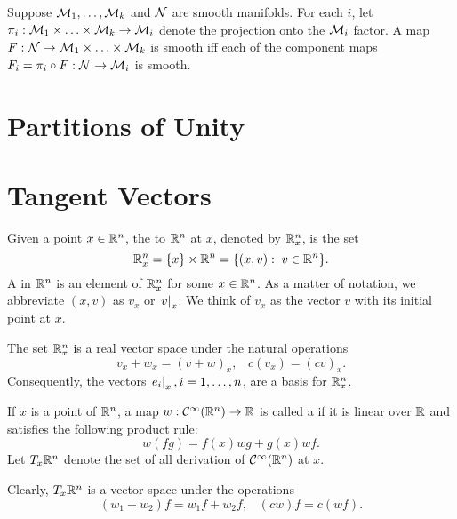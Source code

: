 \documentclass[11pt,a4paper]{article}
\begin{document}
\begin{proposition}
Suppose $\mathcal{M}_1,\ldots, \mathcal{M}_k$ and $\mathcal{N}$ are smooth manifolds. For each $i$, let $\pi_i:\mathcal{M}_1\times\ldots\times\mathcal{M}_k\rightarrow \mathcal{M}_i$ denote the projection onto the $\mathcal{M}_i$ factor. A map $F:\mathcal{N}\rightarrow \mathcal{M}_1\times\ldots\times\mathcal{M}_k$ is smooth iff each of the component maps $F_i = \pi_i\circ F:\mathcal{N}\rightarrow \mathcal{M}_i$ is smooth.
\end{proposition}

\section{Partitions of Unity}

\section{Tangent Vectors}

\begin{definition}
Given a point $x\in \mathbb{R}^n$, the  to $\mathbb{R}^n$ at $x$, denoted by $\mathbb{R}^n_x$, is the set 
$$\mathbb{R}^n_x = \{x\}\times \mathbb{R}^n = \{(x,v):\;v\in\mathbb{R}^n\}.$$ 
A  in $\mathbb{R}^n$ is an element of $\mathbb{R}^n_x$ for some $x \in \mathbb{R}^n$. As a matter of notation, we abbreviate $(x,v)$ as $v_x$ or $\left.v\right|_{x}$. We think of $v_x$ as the vector $v$ with its initial point at $x$.
\end{definition}

\begin{remark}
The set $\mathbb{R}^n_x$ is a real vector space under the natural operations
$$v_x + w_x = (v+w)_x,\;\;\; c(v_x) = (cv)_x.$$
Consequently, the vectors $\left.e_i\right|_{x}, i = 1,\ldots, n$, are a basis for $\mathbb{R}^n_x$.
\end{remark}

\begin{definition}
If $x$ is a point of $\mathbb{R}^n$, a map $w:\mathcal{C}^\infty(\mathbb{R}^n)\rightarrow \mathbb{R}$ is called a  if it is linear over $\mathbb{R}$ and satisfies the following product rule:
$$
w(fg) = f(x)wg + g(x)wf.
$$
Let $T_x\mathbb{R}^n$ denote the set of all derivation of $\mathcal{C}^\infty(\mathbb{R}^n)$ at $x$.
\end{definition}

\begin{remark}
Clearly, $T_x\mathbb{R}^n$ is a vector space under the operations
$$ (w_1+w_2)f = w_1f+w_2f, \;\;\; (cw)f = c(wf). $$
\end{remark}
\end{document}
